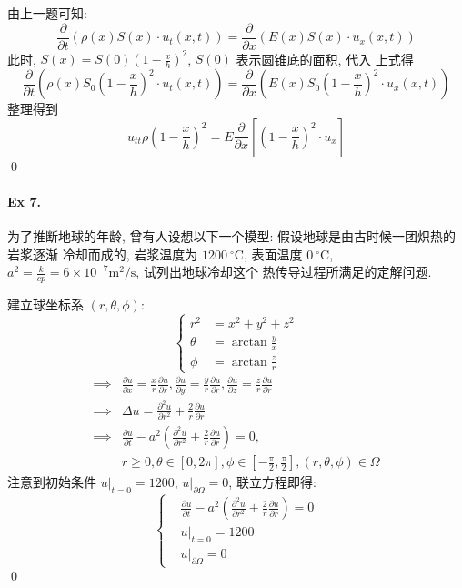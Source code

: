 \begin{solution}
由上一题可知:
\[
\frac{\partial}{\partial t}\left( \rho(x)S(x) \cdot u_t(x, t) \right) =
\frac{\partial}{\partial x}\left( E(x) S(x) \cdot u_x(x, t)\right)
\]
此时, $S(x) = S(0)\left(1 - \frac{x}{h}\right)^2$, $S(0)$ 表示圆锥底的面积, 代入
上式得
\[
\frac{\partial}{\partial t}\left(
  \rho(x) S_0\left(1 - \frac{x}{h}\right)^2 \cdot u_t(x, t)
\right) =
\frac{\partial}{\partial x}\left(
  E(x) S_0\left(1 - \frac{x}{h}\right)^2 \cdot u_x(x, t)
\right)
\]
整理得到
\[
u_{tt} \rho \left(1 - \frac{x}{h}\right)^2 =
E\frac{\partial}{\partial x}\left[
  \left(1 - \frac{x}{h}\right)^2 \cdot u_x
\right]
\]
\qed
\end{solution}


\paragraph{Ex 7.}
为了推断地球的年龄, 曾有人设想以下一个模型: 假设地球是由古时候一团炽热的岩浆逐渐
冷却而成的, 岩浆温度为 $1200\ ^\circ \text{C}$, 表面温度 $0\ ^\circ \text{C}$,
$a^2 = \frac{k}{cp} = 6 \times 10^{-7} \text{m}^2/\text{s}$, 试列出地球冷却这个
热传导过程所满足的定解问题.

\begin{solution}
建立球坐标系 $(r, \theta, \phi)$:
\[ \left\{ \begin{aligned}
r^2 &= x^2 + y^2 + z^2 \\
\theta &= \arctan \frac{y}{x} \\
\phi &= \arctan \frac{z}{r}
\end{aligned} \right. \]
\[ \begin{aligned} \implies &
\frac{\partial u}{\partial x} = \frac{x}{r} \frac{\partial u}{\partial r}, 
\frac{\partial u}{\partial y} = \frac{y}{r} \frac{\partial u}{\partial r}, 
\frac{\partial u}{\partial z} = \frac{z}{r} \frac{\partial u}{\partial r} \\
\implies &
\Delta u = \frac{\partial^2 u}{\partial r^2}
  + \frac{2}{r} \frac{\partial u}{\partial r} \\
\implies &
\frac{\partial u}{\partial t} - a^2 \left(
  \frac{\partial^2 u}{\partial r^2} + \frac{2}{r} \frac{\partial u}{\partial r}
  \right) = 0, \\
& r \geq 0, \theta \in [0, 2\pi],
  \phi \in [-\frac{\pi}{2}, \frac{\pi}{2}], (r, \theta, \phi) \in \Omega
\end{aligned} \]
注意到初始条件 $u|_{t=0} = 1200$, $u|_{\partial \Omega} = 0$, 联立方程即得:
\[ \left\{ \begin{aligned} 
&\frac{\partial u}{\partial t} - a^2 \left(
  \frac{\partial^2 u}{\partial r^2} + \frac{2}{r} \frac{\partial u}{\partial r}
  \right) = 0 \\
&u|_{t=0} = 1200 \\
&u|_{\partial \Omega} = 0
\end{aligned} \right. \]
\qed
\end{solution}


